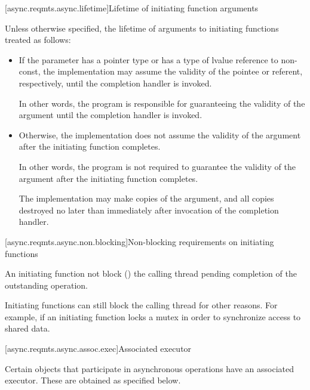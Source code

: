 [async.reqmts.async.lifetime]{Lifetime of initiating function arguments}

%
\pnum
 Unless otherwise specified, the lifetime of arguments to initiating functions  treated as follows:

\begin{itemize}
\item
If the parameter has a pointer type or has a type of lvalue reference to non-const, the implementation may assume the validity of the pointee or referent, respectively, until the completion handler is invoked. \begin{note} In other words, the program is responsible for guaranteeing the validity of the argument until the completion handler is invoked. \end{note}

\item
Otherwise, the implementation does not assume the validity of the argument after the initiating function completes. \begin{note} In other words, the program is not required to guarantee the validity of the argument after the initiating function completes. \end{note} The implementation may make copies of the argument, and all copies  destroyed no later than immediately after invocation of the completion handler.
\end{itemize}



[async.reqmts.async.non.blocking]{Non-blocking requirements on initiating functions}

%
\pnum
 An initiating function  not block () the calling thread pending completion of the outstanding operation.

\pnum
 \begin{note} Initiating functions can still block the calling thread for other reasons. For example, if an initiating function locks a mutex in order to synchronize access to shared data. \end{note}



[async.reqmts.async.assoc.exec]{Associated executor}

%
\pnum
Certain objects that participate in asynchronous operations have an associated executor. These are obtained as specified below.



